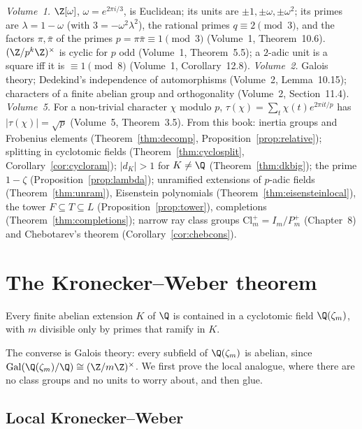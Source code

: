 \begin{reminder}
\emph{Volume~1.} $\Z[\omega]$, $\omega=e^{2\pi i/3}$, is Euclidean; its units are $\pm1,\pm\omega,\pm\omega^2$; its primes are
$\lambda=1-\omega$ (with $3=-\omega^2\lambda^2$), the rational primes $q\equiv2\pmod3$, and the factors $\pi,\bar\pi$ of the primes
$p=\pi\bar\pi\equiv1\pmod3$ (Volume~1, Theorem~10.6). $(\Z/p^k\Z)^\times$ is cyclic for $p$ odd (Volume~1, Theorem~5.5); a $2$-adic unit is a
square iff it is $\equiv1\pmod8$ (Volume~1, Corollary~12.8). \emph{Volume~2.} Galois theory; Dedekind's independence of automorphisms
(Volume~2, Lemma~10.15); characters of a finite abelian group and orthogonality (Volume~2, Section~11.4). \emph{Volume~5.} For a non-trivial
character $\chi$ modulo $p$, $\tau(\chi)=\sum_t\chi(t)e^{2\pi it/p}$ has $|\tau(\chi)|=\sqrt p$ (Volume~5, Theorem~3.5). From this book:
inertia groups and Frobenius elements (Theorem~\ref{thm:decomp}, Proposition~\ref{prop:relative}); splitting in cyclotomic fields
(Theorem~\ref{thm:cyclosplit}, Corollary~\ref{cor:cycloram}); $|d_K|>1$ for $K\ne\Q$ (Theorem~\ref{thm:dkbig}); the prime $1-\zeta$
(Proposition~\ref{prop:lambda}); unramified extensions of $p$-adic fields (Theorem~\ref{thm:unram}), Eisenstein polynomials
(Theorem~\ref{thm:eisensteinlocal}), the tower $F\subseteq T\subseteq L$ (Proposition~\ref{prop:tower}), completions
(Theorem~\ref{thm:completions}); narrow ray class groups $\mathrm{Cl}_m^+=I_m/P_m^+$ (Chapter~8) and Chebotarev's theorem
(Corollary~\ref{cor:chebcons}).
\end{reminder}

\section{The Kronecker--Weber theorem}

\begin{theorem}\label{thm:kw}
Every finite abelian extension $K$ of $\Q$ is contained in a cyclotomic field $\Q(\zeta_m)$, with $m$ divisible only by primes that
ramify in $K$.
\end{theorem}

The converse is Galois theory: every subfield of $\Q(\zeta_m)$ is abelian, since $\operatorname{Gal}(\Q(\zeta_m)/\Q)\cong(\Z/m\Z)^\times$. We
first prove the local analogue, where there are no class groups and no units to worry about, and then glue.

\subsection*{Local Kronecker--Weber}

